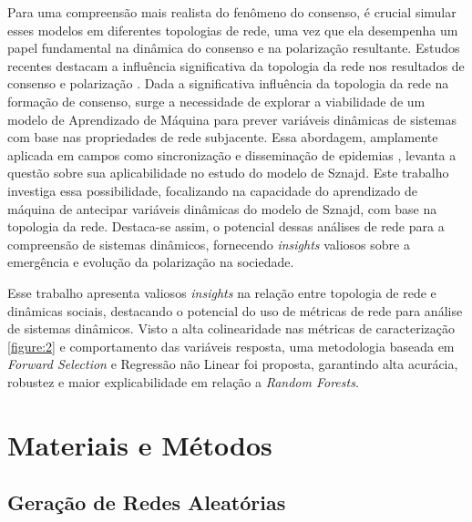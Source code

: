 Para uma compreensão mais realista do fenômeno do consenso, é crucial
simular esses modelos em diferentes topologias de rede, uma vez que ela
desempenha um papel fundamental na dinâmica do consenso e na polarização
resultante. Estudos recentes destacam a influência significativa da
topologia da rede nos resultados de consenso e polarização
\cite{pineda2023machine}. Dada a significativa influência da topologia
da rede na formação de consenso, surge a necessidade de explorar a
viabilidade de um modelo de Aprendizado de Máquina para prever variáveis
dinâmicas de sistemas com base nas propriedades de rede subjacente. Essa
abordagem, amplamente aplicada em campos como sincronização e
disseminação de epidemias \cite{rodrigues2019machine}, levanta a questão
sobre sua aplicabilidade no estudo do modelo de Sznajd. Este trabalho
investiga essa possibilidade, focalizando na capacidade do aprendizado
de máquina de antecipar variáveis dinâmicas do modelo de Sznajd, com
base na topologia da rede. Destaca-se assim, o potencial dessas análises
de rede para a compreensão de sistemas dinâmicos, fornecendo
\textit{insights} valiosos sobre a emergência e evolução da polarização
na sociedade.

Esse trabalho apresenta valiosos \emph{insights} na relação entre
topologia de rede e dinâmicas sociais, destacando o potencial do uso de
métricas de rede para análise de sistemas dinâmicos. Visto a alta
colinearidade nas métricas de caracterização \ref{figure:2} e
comportamento das variáveis resposta, uma metodologia baseada em
\emph{Forward Selection} e Regressão não Linear foi proposta, garantindo
alta acurácia, robustez e maior explicabilidade em relação a
\emph{Random Forests}.

\section{Materiais e Métodos}\label{materiais-e-muxe9todos}

\subsection{Geração de Redes
Aleatórias}\label{gerauxe7uxe3o-de-redes-aleatuxf3rias}

